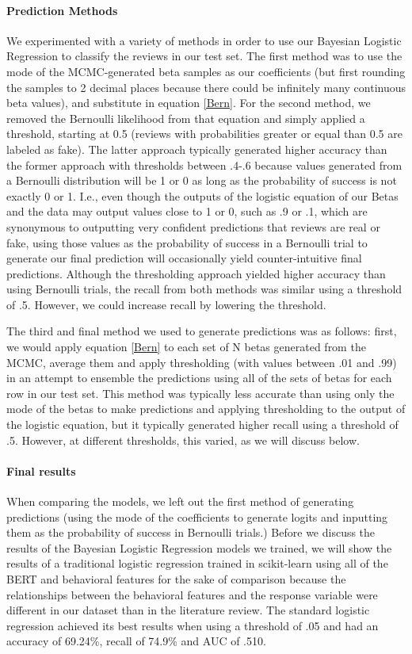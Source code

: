 \paragraph{Prediction Methods} We experimented with a variety of methods in order to use our Bayesian Logistic Regression to classify the reviews in our test set. The first method was to use the mode of the MCMC-generated beta samples as our coefficients (but first rounding the samples to 2 decimal places because there could be infinitely many continuous beta values), and substitute in equation \ref{Bern}. For the second method, we removed the Bernoulli likelihood from that equation and simply applied a threshold, starting at 0.5 (reviews with probabilities greater or equal than 0.5 are labeled as fake). The latter approach typically generated higher accuracy than the former approach with thresholds between .4-.6 because values generated from a Bernoulli distribution will be 1 or 0 as long as the probability of success is not exactly 0 or 1. I.e., even though the outputs of the logistic equation of our Betas and the data may output values close to 1 or 0, such as .9 or .1, which are synonymous to outputting very confident predictions that reviews are real or fake, using those values as the probability of success in a Bernoulli trial to generate our final prediction will occasionally yield counter-intuitive final predictions. Although the thresholding approach yielded higher accuracy than using Bernoulli trials, the recall from both methods was similar using a threshold of .5. However, we could increase recall by lowering the threshold. 



The third and final method we used to generate predictions was as follows: first, we would apply equation \ref{Bern} to each set of N betas generated from the MCMC, average them and apply thresholding (with values between .01 and .99) in an attempt to ensemble the predictions using all of the sets of betas for each row in our test set. This method was typically less accurate than using only the mode of the betas to make predictions and applying thresholding to the output of the logistic equation, but it typically generated higher recall using a threshold of .5. However, at different thresholds, this varied, as we will discuss below. 

\paragraph{Final results} When comparing the models, we left out the first method of generating predictions (using the mode of the coefficients to generate logits and inputting them as the probability of success in Bernoulli trials.) Before we discuss the results of the Bayesian Logistic Regression models we trained, we will show the results of a traditional logistic regression trained in scikit-learn using all of the BERT and behavioral features for the sake of comparison because the relationships between the behavioral features and the response variable were different in our dataset than in the literature review. The standard logistic regression achieved its best results when using a threshold of .05 and had an accuracy of 69.24\%, recall of 74.9\% and AUC of .510. 


